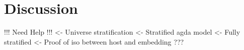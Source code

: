 \section{Discussion}
\label{sec:discussion}

\begin{structure}
!!! Need Help !!!
<- Universe stratification
    <- Stratified agda model
        <- Fully stratified
        <- Proof of iso between host and embedding
    ???
\end{structure}
